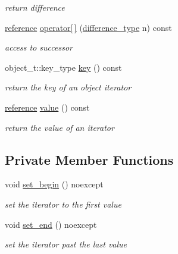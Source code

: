 \begin{DoxyCompactItemize}
\begin{DoxyCompactList}\small\item\em return difference \end{DoxyCompactList}\item 
\hyperlink{classnlohmann_1_1basic__json_1_1iter__impl_ae09599e9cb4a947020a0265c0c4f3d5e}{reference} \hyperlink{classnlohmann_1_1basic__json_1_1iter__impl_ab58eb87c2362183da21c70be74c2b38c}{operator\mbox{[}$\,$\mbox{]}} (\hyperlink{classnlohmann_1_1basic__json_1_1iter__impl_aa3d908ee643e5938d32e5f6d261d7715}{difference\+\_\+type} n) const
\begin{DoxyCompactList}\small\item\em access to successor \end{DoxyCompactList}\item 
object\+\_\+t\+::key\+\_\+type \hyperlink{classnlohmann_1_1basic__json_1_1iter__impl_a030a45b63b70e12b18ad4f6c1c4f1239}{key} () const
\begin{DoxyCompactList}\small\item\em return the key of an object iterator \end{DoxyCompactList}\item 
\hyperlink{classnlohmann_1_1basic__json_1_1iter__impl_ae09599e9cb4a947020a0265c0c4f3d5e}{reference} \hyperlink{classnlohmann_1_1basic__json_1_1iter__impl_a92e849ca687355935c02f492be936b68}{value} () const
\begin{DoxyCompactList}\small\item\em return the value of an iterator \end{DoxyCompactList}\end{DoxyCompactItemize}
\subsection*{Private Member Functions}
\begin{DoxyCompactItemize}
\item 
void \hyperlink{classnlohmann_1_1basic__json_1_1iter__impl_a7f88e3d6564b7d7497b39460b51d2743}{set\+\_\+begin} () noexcept
\begin{DoxyCompactList}\small\item\em set the iterator to the first value \end{DoxyCompactList}\item 
void \hyperlink{classnlohmann_1_1basic__json_1_1iter__impl_a18eb0144dc65b6387a9d8a0be7e9e05c}{set\+\_\+end} () noexcept
\begin{DoxyCompactList}\small\item\em set the iterator past the last value \end{DoxyCompactList}\end{DoxyCompactItemize}
